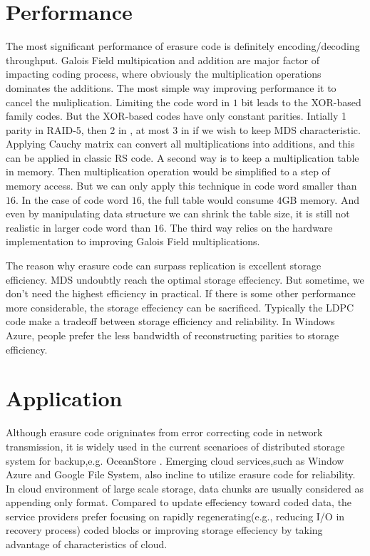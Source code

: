 \documentclass[a4paper, 12pt]{article}
\begin{document}
\section{Performance}
The most significant performance of erasure code is definitely
encoding/decoding throughput. Galois Field multipication and addition
are major factor of impacting coding process, where obviously the
multiplication operations dominates the additions. The most simple way
improving performance it to cancel the muliplication. Limiting the
code word in $1$ bit leads to the XOR-based family codes. But the
XOR-based codes have only constant parities. Intially 1 parity in
RAID-5\cite{chen94}, then 2 in \cite{menon95}, at most 3 in
\cite{huang05} if we wish to keep MDS characteristic. Applying Cauchy
matrix\cite{blomer07} can convert all multiplications into additions,
and this can be applied in classic RS code. A second way is to keep a
multiplication table in memory. Then multiplication operation would be
simplified to a step of memory access. But we can only apply this
technique in code word smaller than $16$. In the case of code word
$16$, the full table would consume $4$GB memory. And even by
manipulating data structure we can shrink the table size, it is still
not realistic in larger code word than $16$. The third way relies on
the hardware implementation to improving Galois Field
multiplications\cite{plank13}.  

The reason why erasure code can surpass replication is excellent
storage efficiency. MDS undoubtly reach the optimal storage
effeciency. But sometime, we don't need the highest efficiency in
practical. If there is some other performance more considerable, the
storage effeciency can be sacrificed. Typically the LDPC code
make a tradeoff between storage efficiency and reliability. In Windows
Azure, people prefer the less bandwidth of reconstructing parities to
storage efficiency\cite{huang12}. 

\section{Application}
Although erasure code origninates from error correcting code in
network transmission, it is widely used in the current scenarioes of
distributed storage system for backup,e.g. OceanStore \cite{bindel00}.
Emerging cloud services,such as Window Azure and Google File System,
also incline to utilize erasure code for reliability\cite{huang12,ghemawat03}. 
In cloud environment of large scale storage, data chunks are usually
considered as appending only format. Compared to update effeciency
toward coded data, the service providers prefer focusing on rapidly
regenerating(e.g., reducing I/O in recovery process) coded blocks
\cite{kbp12, huang12} or improving storage effeciency by taking
advantage of characteristics of cloud\cite{pbh13}. 
\end{document}

